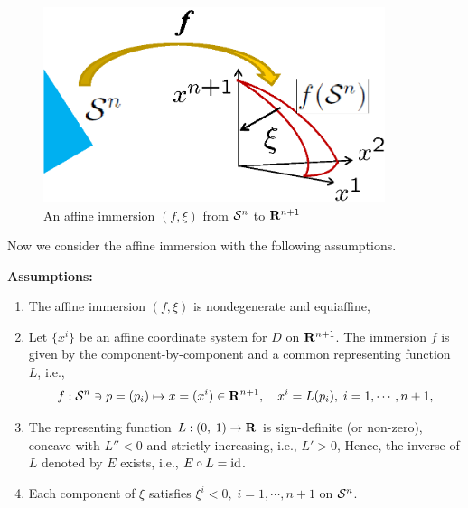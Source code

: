 \documentclass{llncs}
\begin{document}
\begin{figure}[bhtp]
\vspace{0cm}
\begin{center}
\includegraphics[width=10cm]{affine_im2.eps}
\caption{An affine immersion  $(f,\xi)$ from ${\cal S}^n$ to ${\bf R}^{n+1}$}
\end{center}
\end{figure}

Now we consider the affine immersion with the following assumptions.

\noindent 
{\bf Assumptions:}
\begin{enumerate}
\item The affine immersion $(f, \xi)$ is nondegenerate and equiaffine,
\item Let $\{x^i\}$ be an affine coordinate system for $D$ on 
${\bf R}^{n+1}$. 
The immersion $f$ is given by the component-by-component and 
a common representing function $L$, i.e., 
\[
	f:{\cal S}^n \ni p= (p_i) \mapsto x=(x^i) \in {\bf R}^{n+1}, 
	\quad x^i=L(p_i), \; i=1,\cdots,n+1, 
\]
\item The representing function $L:(0,\;1) \rightarrow {\bf R}$ is 
sign-definite (or non-zero), 
concave with $L''<0$ and strictly increasing, i.e., $L' >0$,
Hence, the inverse of $L$ denoted by $E$ exists, i.e.,
$E \circ L ={\rm id}$.
\item Each component of $\xi$ satisfies $\xi^i <0, \; i=1,\cdots,n+1$ 
on ${\cal S}^n$.
\end{enumerate}
\end{document}
